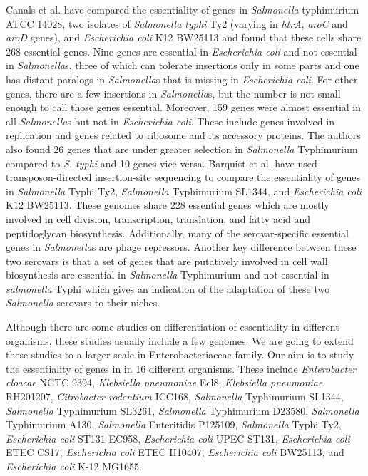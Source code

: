 \documentclass[12pt,letterpaper]{article}
\begin{document}
Canals et al.\@ \cite{canals_high-throughput_2012} have compared the essentiality of genes in \textit{Salmonella} typhimurium ATCC 14028, two isolates of \textit{Salmonella typhi} Ty2 (varying in \textit{htrA}, \textit{aroC} and \textit{aroD} genes), and \textit{Escherichia coli} K12 BW25113 and found that these cells share 268 essential genes. Nine genes are essential in \textit{Escherichia coli} and not essential in \textit{Salmonella}s, three of which can tolerate insertions only in some parts and one has distant paralogs in \textit{Salmonella}s that is missing in \textit{Escherichia coli}. For other genes, there are a few insertions in \textit{Salmonella}s, but the number is not small enough to call those genes essential. Moreover, 159 genes were almost essential in all \textit{Salmonella}s but not in \textit{Escherichia coli}. These include genes involved in replication and genes related to ribosome and its accessory proteins. The authors also found 26 genes that are under greater selection in \textit{Salmonella} Typhimurium compared to \textit{S. typhi} and 10 genes vice versa. Barquist et al. \cite{barquist_comparison_2013} have used transposon-directed insertion-site sequencing to compare the essentiality of genes in \textit{Salmonella} Typhi Ty2, \textit{Salmonella} Typhimurium SL1344, and \textit{Escherichia coli} K12 BW25113. 
These genomes share 228 essential genes which are mostly involved in cell division, transcription, translation, and fatty acid and peptidoglycan biosynthesis. Additionally, many of the serovar-specific essential genes in \textit{Salmonella}s are phage repressors. Another key difference between these two serovars is that a set of genes that are putatively involved in cell wall biosynthesis are essential in \textit{Salmonella} Typhimurium and not essential in \textit{salmonella} Typhi which gives an indication of the adaptation of these two \textit{Salmonella} serovars to their niches.

Although there are some studies on differentiation of essentiality in different organisms, these studies usually include a few genomes. We are going to extend these studies to a larger scale in Enterobacteriaceae family. Our aim is to study the essentiality of genes in in 16 different organisms. These include \textit{Enterobacter cloacae} NCTC 9394, \textit{Klebsiella pneumoniae} Ecl8, \textit{Klebsiella pneumoniae} RH201207, \textit{Citrobacter rodentium} ICC168, \textit{Salmonella} Typhimurium SL1344, \textit{Salmonella} Typhimurium SL3261, \textit{Salmonella} Typhimurium D23580, \textit{Salmonella} Typhimurium A130, \textit{Salmonella} Enteritidis P125109, \textit{Salmonella} Typhi Ty2, \textit{Escherichia coli} ST131 EC958, \textit{Escherichia coli} UPEC ST131, \textit{Escherichia coli} ETEC CS17, \textit{Escherichia coli} ETEC H10407, \textit{Escherichia coli} BW25113, and \textit{Escherichia coli} K-12 MG1655.
\end{document}
